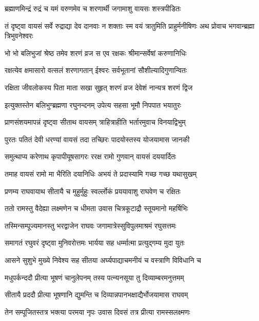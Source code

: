 \twolineshloka
{ब्रह्माणमिन्द्रं रुद्रं च यमं वरुणमेव च}
{शरणार्थी जगामाशु वायसः शस्त्रपीडितः}%


\threelineshloka
{तं दृष्ट्वा वायसं सर्वे रुद्राद्या देव दानवाः}
{न शक्ताः स्म वयं त्रातुमिति प्राहुर्मनीषिणः}
{अथ प्रोवाच भगवान्ब्रह्मा त्रिभुवनेश्वरः}%


\twolineshloka
{भो भो बलिभुजां श्रेष्ठ तमेव शरणं व्रज}
{स एव रक्षकः श्रीमान्सर्वेषां करुणानिधिः}%

\twolineshloka
{रक्षत्येव क्षमासारो वत्सलं शरणागतान्}
{ईश्वरः सर्वभूतानां सौशील्यादिगुणान्वितः}%

\twolineshloka
{रक्षिता जीवलोकस्य पिता माता सखा सुहृत्}
{शरणं व्रज देवेशं नान्यत्र शरणं द्विज}%


\twolineshloka
{इत्युक्तस्तेन बलिभुग्ब्रह्मणा रघुनन्दनम्}
{उपेत्य सहसा भूमौ निपपात भयातुरः}%

\twolineshloka
{प्राणसंशयमापन्नं दृष्ट्वा सीताथ वायसम्}
{त्राहित्राहीति भर्तारमुवाच विनयाद्विभुम्}%

\twolineshloka
{पुरतः पतितं देवी धरण्यां वायसं तदा}
{तच्छिरः पादयोस्तस्य योजयामास जानकी}%

\twolineshloka
{समुत्थाप्य करेणाथ कृपापीयूषसागरः}
{ररक्ष रामो गुणवान् वायसं दययार्दितः}%

\twolineshloka
{तमाह वायसं रामो मा भैरिति दयानिधिः}
{अभयं ते प्रदास्यामि गच्छ गच्छ यथासुखम्}%

\twolineshloka
{प्रणम्य राघवायाथ सीतायै च मुहुर्मुहुः}
{स्वर्ल्लोकं प्रययावाशु राघवेण च रक्षितः}%

\twolineshloka
{ततो रामस्तु वैदेह्या लक्ष्मणेन च धीमता}
{उवास चित्रकूटाद्रौ स्तूयमानो महर्षिभिः}%

\twolineshloka
{तस्मिन्सम्पूज्यमानस्तु भरद्वाजेन राघवः}
{जगामात्रेस्सुविपुलमाश्रमं रघुसत्तमः}%

\twolineshloka
{समागतं रघुवरं दृष्ट्वा मुनिवरोत्तमः}
{भार्यया सह धर्म्मात्मा प्रत्युद्गम्य मुदा युतः}%

\twolineshloka
{आसने सुशुभे मुख्ये निवेश्य सह सीतया}
{अर्घ्यपाद्याचमनीयं च वस्त्राणि विविधानि च}%

\twolineshloka
{मधुपर्कन्ददौ प्रीत्या भूषणं चानुलेपनम्}
{तस्य पत्न्यनसूया तु दिव्याम्बरमनुत्तमम्}%

\twolineshloka
{सीतायै प्रददौ प्रीत्या भूषणानि द्युमन्ति च}
{दिव्यान्नपानभक्षाद्यैर्भोजयामास राघवम्}%

\twolineshloka
{तेन सम्पूजितस्तत्र भक्त्या परमया नृपः}
{उवास दिवसं तत्र प्रीत्या रामस्सलक्ष्मणः}%

